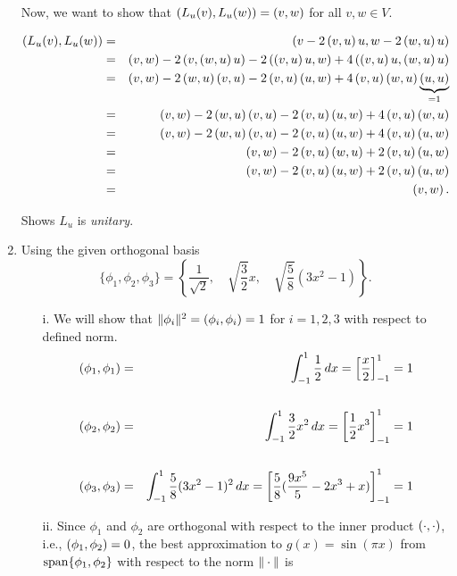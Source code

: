 \begin{solution}
\begin{enumerate}
Now, we want to show that $\left( L_u(v),L_u(w) \right)= \left( v,w \right)$ for all $v,w \in V$.

\begin{eqnarray*}
\left(  L_u(v), L_u(w) \right) &=& \left(  v-2\left(  v, u  \right) u, w-2\left(  w, u  \right) u  \right) \\
&=& \left(  v, w  \right) - 2\left(  v, \left(  w, u  \right) u  \right) - 2 \left(  \left(  v,u  \right) u, w  \right) +4 \left( \left(  v, u  \right) u, \left(  w, u  \right) u  \right) \\
&=& \left(  v, w  \right) - 2 \left(  w, u  \right) \left(  v, u  \right) - 2 \left(  v,u  \right) \left(  u, w  \right) + 4 \left(  v, u  \right) \left(  w, u  \right) \underbrace{\left(  u, u  \right)}_{=1} \\
&=& \left(  v, w  \right) - 2 \left(  w, u  \right) \left(  v, u  \right) - 2 \left(  v,u  \right) \left(  u, w  \right) + 4 \left(  v, u  \right) \left(  w, u  \right) \\
&=& \left(  v, w  \right) - 2 \left(  w, u  \right) \left(  v, u  \right) - 2 \left(  v,u  \right) \left(  u, w  \right) + 4 \left(  v, u  \right) \left(  u, w  \right) \\
&=& \left(  v, w  \right) - 2 \left(  v,u  \right) \left(  w, u  \right) + 2 \left(  v, u  \right) \left(  u, w  \right) \\
&=& \left(  v, w  \right) - 2 \left(  v,u  \right) \left(  u, w  \right) + 2 \left(  v, u  \right) \left(  u, w  \right) \\
&=& \left(  v, w  \right).
\end{eqnarray*}

Shows  $L_u$ is \emph{unitary}.

\item Using the given orthogonal basis
\[
\{\phi_1, \phi_2, \phi_3\}= \left\{\frac{1}{\sqrt{2}}, \quad \sqrt{\frac{3}{2}}x,  \quad \sqrt{\frac{5}{8}}(3x^2 -1)\right\}.
\] 
\begin{itemize}
\item[i.] We will show that $\| \phi_i \|^2= \left( \phi_i, \phi_i \right)=1$ for $i=1,2,3$ with respect to defined norm. 
\begin{eqnarray*}
\left( \phi_1, \phi_1 \right) &=& \int_{-1}^1 \frac{1}{2} \, dx = \left[\frac{x}{2} \right]_{-1}^{1}= 1\\
\\
\left( \phi_2, \phi_2 \right) &=& \int_{-1}^1 \frac{3}{2} x^2 \, dx = \left[\frac{1}{2} x^3 \right]_{-1}^{1}= 1 \\
\\
\left( \phi_3, \phi_3 \right) &=& \int_{-1}^1 \frac{5}{8} (3x^2-1)^2 \, dx = \left[\frac{5}{8} (\frac{9 x^5}{5}-2 x^3 + x) \right]_{-1}^{1}= 1 
\end{eqnarray*} 

\item[ii.] Since $\phi_1$ and $\phi_2$ are orthogonal with respect to the inner product $\left( \cdot,\cdot \right)$, i.e., $\left( \phi_1, \phi_2 \right) = 0$, the best approximation to $g(x) = \sin(\pi x)$ from ${\rm span}\{\phi_1,\phi_2\}$ with respect to the norm $\|\cdot\|$ is


\end{itemize}
\end{enumerate}
\end{solution}
